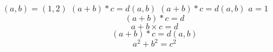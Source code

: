 \((a, b)=(1, 2)\)  %
\((a + b) * c = d(a, b)\)  %
$(a + b) * c = d(a, b)$    %
$a = 1$  %
\[(a + b) * c = d\]  %
\[a + b \times c = d\]  %
\[(a + b) * c = d(a, b)\]  %
\begin{equation}
	a^2 + b^2 = c^2
\end{equation}
